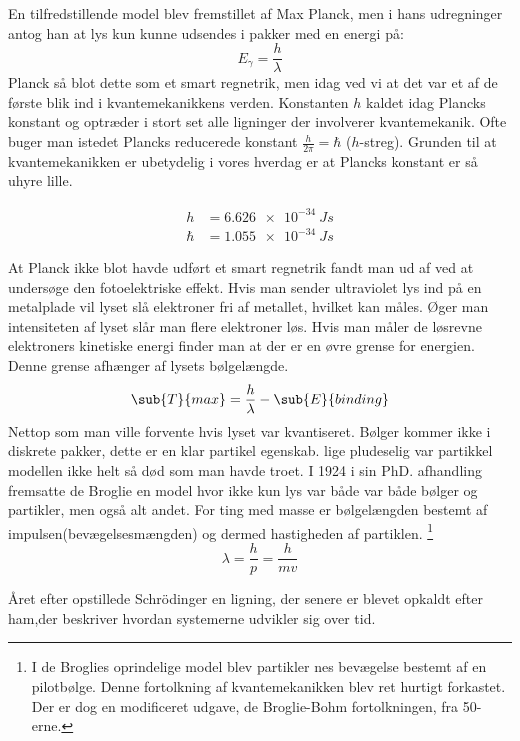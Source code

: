 En tilfredstillende model blev fremstillet af Max Planck, men i hans udregninger antog han at lys kun kunne udsendes i pakker med en energi på:
\begin{equation}
E_\gamma = \frac{h}{\lambda}
\end{equation}
Planck så blot dette som et smart regnetrik, men idag ved vi at det var et af de første blik ind i kvantemekanikkens verden. Konstanten $h$ kaldet idag Plancks konstant og optræder i stort set alle ligninger der involverer kvantemekanik. Ofte buger man istedet Plancks reducerede konstant $\frac{h}{2\pi}=\hbar$ ($h$-streg).
Grunden til at kvantemekanikken er ubetydelig i vores hverdag er at Plancks konstant er så uhyre lille. 

\begin{align*}
h &= \SI{6.626e-34}{Js}\\
\hbar &= \SI{1.055e-34}{Js}
\end{align*}

At Planck ikke blot havde udført et smart regnetrik fandt man ud af ved at undersøge den fotoelektriske effekt. Hvis man sender ultraviolet lys ind på en metalplade vil lyset slå elektroner fri af metallet, hvilket kan måles. Øger man intensiteten af lyset slår man flere elektroner løs. Hvis man måler de løsrevne elektroners kinetiske energi finder man at der er en øvre grense for energien. Denne grense afhænger af lysets bølgelængde.
$$
\sub{T}{max} = \frac{h}{\lambda}-\sub{E}{binding}
$$
Nettop som man ville forvente hvis lyset var kvantiseret. Bølger kommer ikke i diskrete pakker, dette er en klar partikel egenskab.
lige pludeselig var partikkel modellen ikke helt så død som man havde troet. I 1924 i sin PhD. afhandling fremsatte de Broglie en model hvor ikke kun lys var både var både bølger og partikler, men også alt andet. For ting med masse er bølgelængden bestemt af impulsen(bevægelsesmængden) og dermed hastigheden af partiklen.
\footnote{I de Broglies oprindelige model blev partikler nes bevægelse bestemt af en pilotbølge. Denne fortolkning af kvantemekanikken blev ret hurtigt forkastet. Der er dog en modificeret udgave, de Broglie-Bohm fortolkningen, fra 50-erne.}
\begin{equation}
\lambda = \frac{h}{p} = \frac{h}{mv}
\end{equation}

Året efter opstillede Schrödinger en ligning, der senere er blevet opkaldt efter ham,der beskriver hvordan systemerne udvikler sig over tid. 